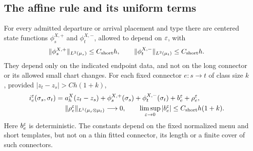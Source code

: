 \subsection{The affine rule and its uniform terms}

\begin{proposition}\label{prop:endpoint-potentials}
For every admitted departure or arrival placement and type there are
centered state functions $\phi_s^{X,+}$ and $\phi_t^{X,-}$, allowed to
depend on $\varepsilon$, with
\[
 \|\phi_s^{X,+}\|_{L^2(\mu_s)}\le C_{\rm short}h,
 \qquad
 \|\phi_t^{X,-}\|_{L^2(\mu_t)}\le C_{\rm short}h.
\]
They depend only on the indicated endpoint data, and not on the long
connector or its allowed small chart changes.  For each fixed connector
$e:s\to t$ of class size $k$, provided $|z_t-z_s|>Ch(1+k)$,
\begin{equation}\label{affine:transport}
 \begin{split}
 i_e^\varepsilon(\sigma_s,\sigma_t)
   ={}&a_h^X(z_t-z_s)
       +\phi_s^{X,+}(\sigma_s)+\phi_t^{X,-}(\sigma_t)
       +b_e^\varepsilon+\rho_e^\varepsilon,\\
 &\|\rho_e^\varepsilon\|_{L^1(\mu_s\otimes\mu_t)}\longrightarrow0,
 \qquad
 \limsup_{\varepsilon\to0}|b_e^\varepsilon|\le C_{\rm short}h(1+k).
 \end{split}
\end{equation}
Here $b_e^\varepsilon$ is deterministic.  The constants depend on the fixed
normalized menu and short templates, but not on a thin fitted connector,
its length or a finite cover of such connectors.
\end{proposition}

